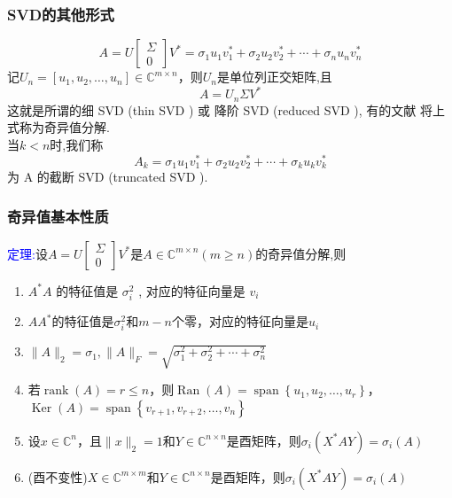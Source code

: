 \documentclass[notheorems,serif]{beamer}
\begin{document}
\begin{frame}
\frametitle{SVD的其他形式}
$$
A=U\left[\begin{array}{l}{\Sigma} \\ {0}\end{array}\right] V^{*}=\sigma_{1} u_{1} v_{1}^{*}+\sigma_{2} u_{2} v_{2}^{*}+\cdots+\sigma_{n} u_{n} v_{n}^{*}
$$
记$U_{n}=\left[u_{1}, u_{2}, \ldots, u_{n}\right] \in \mathbb{C}^{m \times n}$，则$U_{n}$是单位列正交矩阵,且
\begin{equation}
A=U_{n} \Sigma V^{*}
\end{equation}
这就是所谓的细 SVD (thin SVD ) 或 降阶 SVD (reduced SVD ), 有的文献 将上式称为奇异值分解.\\
当$k < n$时,我们称
$$
A_{k}=\sigma_{1} u_{1} v_{1}^{*}+\sigma_{2} u_{2} v_{2}^{*}+\cdots+\sigma_{k} u_{k} v_{k}^{*}
$$
为 A 的截断 SVD (truncated SVD ).
\end{frame}

\begin{frame}
\frametitle{奇异值基本性质}
\textcolor{blue}{定理:}设$A=U\left[\begin{array}{l}{\Sigma} \\ {0}\end{array}\right] V^{*}$是$A \in \mathbb{C}^{m \times n}(m \geq n)$的奇异值分解,则
\begin{enumerate}[(1)]
	\item $A^{*} A$ 的特征值是 $\sigma_{i}^{2}$ , 对应的特征向量是 $v_{i}$
	\item $AA^{*}$的特征值是$\sigma_{i}^{2}$和$m-n$个零，对应的特征向量是$u_{i}$
	\item $\|A\|_{2}=\sigma_{1},\|A\|_{F}=\sqrt{\sigma_{1}^{2}+\sigma_{2}^{2}+\cdots+\sigma_{n}^{2}}$
	\item 若$\operatorname{rank}(A)=r \leq n$，则$\operatorname{Ran}(A)=\operatorname{span}\left\{u_{1}, u_{2}, \ldots, u_{r}\right\}$，$\operatorname{Ker}(A)=\operatorname{span}\left\{v_{r+1}, v_{r+2}, \ldots, v_{n}\right\}$
	\item 设$x \in \mathbb{C}^{n}$，且$\|x\|_{2}=1$和$Y \in \mathbb{C}^{n \times n}$是酉矩阵，则$\sigma_{i}\left(X^{*} A Y\right)=\sigma_{i}(A)$
	\item (酉不变性)$X \in \mathbb{C}^{m \times m}$和$Y \in \mathbb{C}^{n \times n}$是酉矩阵，则$\sigma_{i}\left(X^{*} A Y\right)=\sigma_{i}(A)$
\end{enumerate}
\end{frame}
\end{document}
